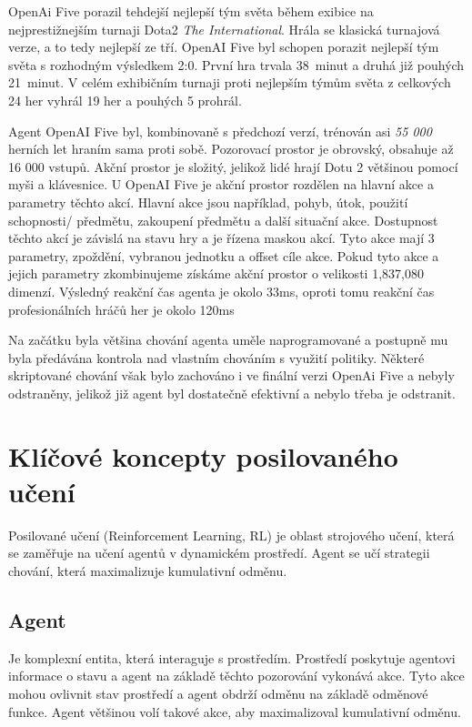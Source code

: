 OpenAi Five porazil tehdejší nejlepší tým světa během exibice na nejprestižnejším turnaji Dota2 \textit{The International}.
Hrála se klasická turnajová verze, a to tedy nejlepší ze tří.
OpenAI Five byl schopen porazit nejlepší tým světa s rozhodným výsledkem 2:0.
První hra trvala 38~minut a druhá již pouhých 21~minut.
V celém exhibičním turnaji proti nejlepším týmům světa z celkových 24 her vyhrál 19 her a pouhých 5 prohrál.

Agent OpenAI Five byl, kombinovaně s předchozí verzí, trénován asi \emph{55 000} herních let hraním sama proti sobě.
Pozorovací prostor je obrovský, obsahuje až 16 000 vstupů.
Akční prostor je složitý, jelikož lidé hrají Dotu 2 většinou pomocí myši a klávesnice.
U OpenAI Five je akční prostor rozdělen na hlavní akce a parametry těchto akcí.
Hlavní akce jsou například, pohyb, útok, použití schopnosti/ předmětu, zakoupení předmětu a další situační akce.
Dostupnost těchto akcí je závislá na stavu hry a je řízena maskou akcí.
Tyto akce mají 3 parametry, zpoždění, vybranou jednotku a offset cíle akce.
Pokud tyto akce a jejich parametry zkombinujeme získáme akční prostor o velikosti 1,837,080 dimenzí.
Výsledný reakční čas agenta je okolo 33ms, oproti tomu reakční čas profesionálních hráčů her je okolo 120ms\cite{reaction_time}

Na začátku byla většina chování agenta uměle naprogramované a postupně mu byla předávána kontrola nad vlastním chováním s využití politiky.
Některé skriptované chování však bylo zachováno i ve finální verzi OpenAi Five a nebyly odstraněny, jelikož již agent byl dostatečně efektivní a nebylo třeba je odstranit.

\section{Klíčové koncepty posilovaného učení}\label{sec:klicove-koncepty-posilovaneho-uceni}
Posilované učení (Reinforcement Learning, RL) je oblast strojového učení, která se zaměřuje na učení agentů v dynamickém prostředí.
Agent se učí strategii chování, která maximalizuje kumulativní odměnu.

\subsection{Agent}\label{subsec:agent}

Je komplexní entita, která interaguje s prostředím.
Prostředí poskytuje agentovi informace o stavu a agent na základě těchto pozorování vykonává akce.
Tyto akce mohou ovlivnit stav prostředí a agent obdrží odměnu na základě odměnové funkce.
Agent většinou volí takové akce, aby maximalizoval kumulativní odměnu.

